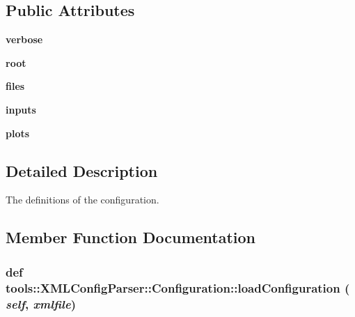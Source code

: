 \subsection*{Public Attributes}
\begin{CompactItemize}
\item 
\hypertarget{classtools_1_1XMLConfigParser_1_1Configuration_221113167305d9e138751bf620da3c9b}{
\textbf{verbose}}
\label{classtools_1_1XMLConfigParser_1_1Configuration_221113167305d9e138751bf620da3c9b}

\item 
\hypertarget{classtools_1_1XMLConfigParser_1_1Configuration_3c66d45066e75498187f0090d0ce6034}{
\textbf{root}}
\label{classtools_1_1XMLConfigParser_1_1Configuration_3c66d45066e75498187f0090d0ce6034}

\item 
\hypertarget{classtools_1_1XMLConfigParser_1_1Configuration_fef648101e7637786aa1b137553c5340}{
\textbf{files}}
\label{classtools_1_1XMLConfigParser_1_1Configuration_fef648101e7637786aa1b137553c5340}

\item 
\hypertarget{classtools_1_1XMLConfigParser_1_1Configuration_be035d534c25acfafbd217706c73020b}{
\textbf{inputs}}
\label{classtools_1_1XMLConfigParser_1_1Configuration_be035d534c25acfafbd217706c73020b}

\item 
\hypertarget{classtools_1_1XMLConfigParser_1_1Configuration_a3a6517684516bfa14602af9b867bbf3}{
\textbf{plots}}
\label{classtools_1_1XMLConfigParser_1_1Configuration_a3a6517684516bfa14602af9b867bbf3}

\end{CompactItemize}


\subsection{Detailed Description}
The definitions of the configuration. 

\subsection{Member Function Documentation}
\hypertarget{classtools_1_1XMLConfigParser_1_1Configuration_7b585a1138fb8a821c50d227878250d4}{
\subsubsection{\setlength{\rightskip}{0pt plus 5cm}def tools::XMLConfigParser::Configuration::loadConfiguration ( {\em self}, \/   {\em xmlfile})}}
\label{classtools_1_1XMLConfigParser_1_1Configuration_7b585a1138fb8a821c50d227878250d4}



